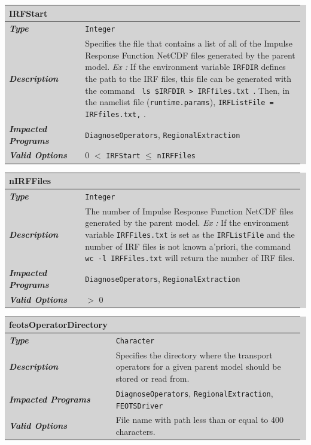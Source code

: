 \documentclass{softwaremanual}
\begin{document}
\noindent\begingroup\setlength{\fboxsep}{0pt}
\colorbox{lightgray}{
\begin{tabular}{p{0.25\linewidth} p{0.725\linewidth}}
\toprule
\textbf{IRFStart} & \\
\midrule
\textbf{\textit{Type}} & \texttt{Integer} \\
\midrule
\textbf{\textit{Description}} & Specifies the file that contains a list of all of the Impulse Response Function NetCDF files generated by the parent model. \textit{Ex :} If the environment variable \texttt{IRFDIR} defines the path to the IRF files, this file can be generated with the command \texttt{ ls \$IRFDIR > IRFfiles.txt }. Then, in the namelist file (\texttt{runtime.params}), \texttt{IRFListFile = IRFfiles.txt,} . \\
\midrule
\textbf{\textit{Impacted Programs}} & \texttt{DiagnoseOperators}, \texttt{RegionalExtraction} \\
\midrule
\textbf{\textit{Valid Options}}  & 0 $<$ \texttt{IRFStart} $\leq$ \texttt{nIRFFiles}  \\
\bottomrule
\end{tabular}
}\endgroup

\noindent\begingroup\setlength{\fboxsep}{0pt}
\colorbox{lightgray}{
\begin{tabular}{p{0.25\linewidth} p{0.725\linewidth}}
\toprule
\textbf{nIRFFiles} & \\
\midrule
\textbf{\textit{Type}} & \texttt{Integer} \\
\midrule
\textbf{\textit{Description}} & The number of Impulse Response Function NetCDF files generated by the parent model. \textit{Ex :} If the environment variable \texttt{IRFFiles.txt} is set as the \texttt{IRFListFile} and the number of IRF files is not known a'priori, the command \texttt{wc -l IRFFiles.txt} will return the number of IRF files. \\
\midrule
\textbf{\textit{Impacted Programs}} & \texttt{DiagnoseOperators}, \texttt{RegionalExtraction} \\
\midrule
\textbf{\textit{Valid Options}}  &  $>$ 0 \\
\bottomrule
\end{tabular}
}\endgroup

\noindent\begingroup\setlength{\fboxsep}{0pt}
\colorbox{lightgray}{
\begin{tabular}{p{0.25\linewidth} p{0.725\linewidth}}
\toprule
\textbf{feotsOperatorDirectory} & \\
\midrule
\textbf{\textit{Type}} & \texttt{Character} \\
\midrule
\textbf{\textit{Description}} & Specifies the directory where the transport operators for a given parent model should be stored or read from. \\
\midrule
\textbf{\textit{Impacted Programs}} & \texttt{DiagnoseOperators}, \texttt{RegionalExtraction}, \texttt{FEOTSDriver} \\
\midrule
\textbf{\textit{Valid Options}}  & File name with path less than or equal to 400 characters. \\
\bottomrule
\end{tabular}
}\endgroup
\end{document}
